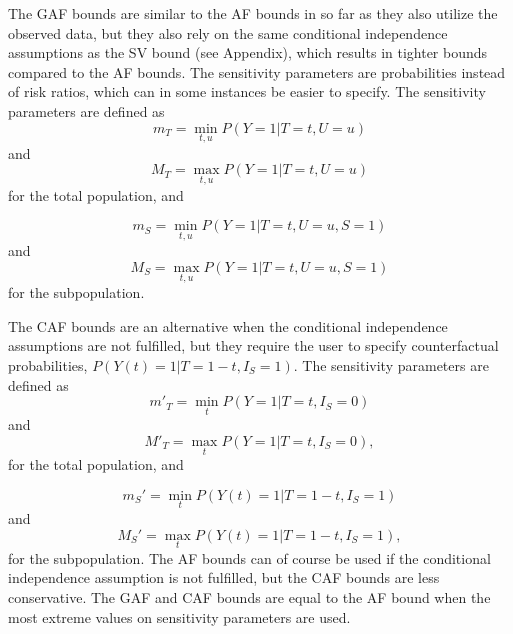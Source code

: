 The GAF bounds are similar to the AF bounds in so far as they also utilize the
observed data, but they also rely on the same conditional independence
assumptions as the SV bound (see Appendix), which results in tighter bounds
compared to the AF bounds. The sensitivity parameters are probabilities instead
of risk ratios, which can in some instances be easier to specify.
The sensitivity parameters are defined as
\[
    m_T=\min_{t,u}P(Y=1|T=t,U=u)
\]
and
\[
    M_T= \max_{t,u}P(Y=1|T=t,U=u)
\]
for the total population, and

\[
    m_S=\min_{t,u}P(Y=1|T=t,U=u,S=1)
\]
and
\[
    M_S =\max_{t,u}P(Y=1|T=t,U=u,S=1)
\]
for the subpopulation.

The CAF bounds are an alternative when the conditional independence assumptions
are not fulfilled, but they require the user to specify counterfactual
probabilities, \(P(Y(t)=1|T=1-t,I_S=1)\). The sensitivity parameters are defined as
\[
    m'_T=\min_t P(Y=1|T=t,I_S=0)
\]
and
\[
    M'_T=\max_t P(Y=1|T=t,I_S=0),
\]
for the total population, and

\[
    m_S'=\min_t P(Y(t)=1|T=1-t,I_S=1)
\]
and
\[
    M_S'=\max_t P(Y(t)=1|T=1-t,I_S=1),
\]
for the subpopulation. The AF bounds can of course be used if the conditional
independence assumption is not fulfilled, but the CAF bounds are less conservative.
The GAF and CAF bounds are equal to the AF bound when the most extreme values on
sensitivity parameters are used.

